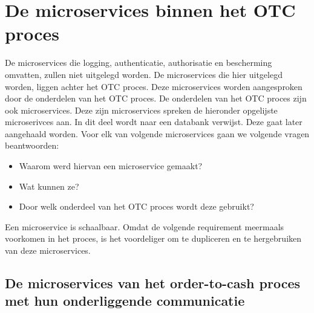 \begin{table}[]
	\caption{Termen die vaker voorkomen in dit hoofdstuk.}
\end{table}

\section{De microservices binnen het OTC proces}
De microservices die logging, authenticatie, authorisatie en bescherming omvatten, zullen niet uitgelegd worden.
De microservices die hier uitgelegd worden, liggen achter het OTC proces. Deze microservices worden aangesproken door de onderdelen van het OTC proces. 
De onderdelen van het OTC proces zijn ook microservices. Deze zijn microservices spreken de hieronder opgelijste microserivces aan.
In dit deel wordt naar een databank verwijst. Deze gaat later aangehaald worden.
Voor elk van volgende microservices gaan we volgende vragen beantwoorden:
\begin{itemize}
	\item Waarom werd hiervan een microservice gemaakt?
	\item Wat kunnen ze?
	\item Door welk onderdeel van het OTC proces wordt deze gebruikt?
\end{itemize}

Een microservice is schaalbaar. Omdat de volgende requirement meermaals voorkomen in het proces, is het voordeliger om te dupliceren en te hergebruiken van deze microservices. 

\subsection{De microservices van het order-to-cash proces met hun onderliggende communicatie}
